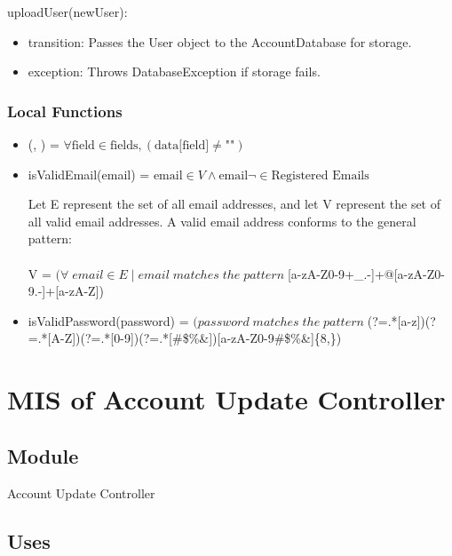 \documentclass[12pt, titlepage]{article}
\begin{document}
\noindent uploadUser(newUser):
\begin{itemize}
\item transition: Passes the User object to the AccountDatabase for storage.
\item exception: Throws DatabaseException if storage fails.
\end{itemize}

\subsubsection{Local Functions}
\begin{itemize}
    \item 
        (, ) =
        $\forall \text{field} \in \text{fields}, (\text{data[field]} \neq \text{""})$
        
    \item isValidEmail(email) = $\text{email} \in V \land \text{email} \neg \in \text{Registered Emails}$
    
    Let E represent the set of all email addresses, and let V represent the set of all valid email addresses. A valid email address conforms to the general pattern:\\\\
  V = $(\forall\; email \in E\;  |\; email \; matches \; the \; pattern \; $[a-zA-Z0-9+\_.-]+@[a-zA-Z0-9.-]+[a-zA-Z])
  \item isValidPassword(password) = $(password \; matches \; the \; pattern \; $(?=.*[a-z])(?=.*[A-Z])(?=.*[0-9])(?=.*[\#\$\%\&\*\@])[a-zA-Z0-9\#\$\%\&\*\@]\{8,\})\\
  
\end{itemize}

\section{MIS of Account Update Controller} \label{auc}

\subsection{Module}

Account Update Controller

\subsection{Uses}
\end{document}
